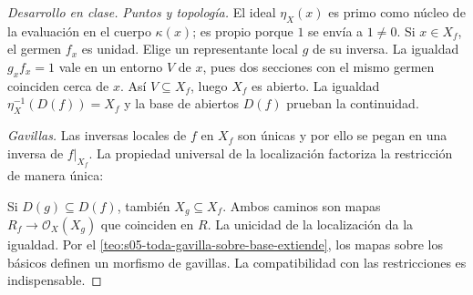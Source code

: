 \begin{proof}[Desarrollo en clase]
\emph{Puntos y topología.} El ideal $\eta_X(x)$ es primo como núcleo de la evaluación en el cuerpo $\kappa(x)$; es propio porque $1$ se envía a $1\ne0$. Si $x\in X_f$, el germen $f_x$ es unidad. Elige un representante local $g$ de su inversa. La igualdad $g_xf_x=1$ vale en un entorno $V$ de $x$, pues dos secciones con el mismo germen coinciden cerca de $x$. Así $V\subseteq X_f$, luego $X_f$ es abierto. La igualdad $\eta_X^{-1}(D(f))=X_f$ y la base de abiertos $D(f)$ prueban la continuidad.

\emph{Gavillas.} Las inversas locales de $f$ en $X_f$ son únicas y por ello se pegan en una inversa de $f|_{X_f}$. La propiedad universal de la localización factoriza la restricción de manera única:
\begin{center}
\begin{minipage}{.45\textwidth}
\centering
{}
\end{minipage}\hfill
\begin{minipage}{.51\textwidth}
\centering
{}
\end{minipage}
\end{center}
Si $D(g)\subseteq D(f)$, también $X_g\subseteq X_f$. Ambos caminos son mapas $R_f\to\mathcal O_X(X_g)$ que coinciden en $R$. La unicidad de la localización da la igualdad. Por el \cref{teo:s05-toda-gavilla-sobre-base-extiende}, los mapas sobre los básicos definen un morfismo de gavillas. La compatibilidad con las restricciones es indispensable.


\end{proof}
